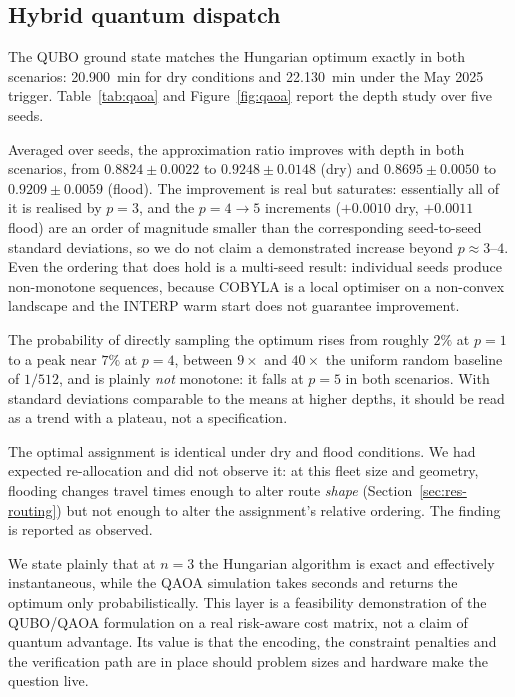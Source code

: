 \documentclass[11pt,a4paper]{article}
\begin{document}
\subsection{Hybrid quantum dispatch}
\label{sec:res-qaoa}

The QUBO ground state matches the Hungarian optimum exactly in both scenarios:
\SI{20.900}{\minute} for dry conditions and \SI{22.130}{\minute} under the
May 2025 trigger. Table~\ref{tab:qaoa} and Figure~\ref{fig:qaoa} report the depth
study over five seeds.

Averaged over seeds, the approximation ratio improves with depth in both
scenarios, from $0.8824\pm0.0022$ to $0.9248\pm0.0148$ (dry) and
$0.8695\pm0.0050$ to $0.9209\pm0.0059$ (flood). The improvement is real but
saturates: essentially all of it is realised by $p=3$, and the $p=4\to5$
increments ($+0.0010$ dry, $+0.0011$ flood) are an order of magnitude smaller
than the corresponding seed-to-seed standard deviations, so we do not claim a
demonstrated increase beyond $p\approx3$--$4$. Even the ordering that does hold
is a multi-seed result: individual seeds produce non-monotone sequences, because
COBYLA is a local optimiser on a non-convex landscape and the INTERP warm start
does not guarantee improvement.

The probability of directly sampling the optimum rises from roughly $2\%$ at
$p=1$ to a peak near $7\%$ at $p=4$, between $9\times$ and $40\times$ the uniform
random baseline of $1/512$, and is plainly \emph{not} monotone: it falls at $p=5$
in both scenarios. With standard deviations comparable to the means at higher
depths, it should be read as a trend with a plateau, not a specification.

The optimal assignment is identical under dry and flood conditions. We had
expected re-allocation and did not observe it: at this fleet size and geometry,
flooding changes travel times enough to alter route \emph{shape}
(Section~\ref{sec:res-routing}) but not enough to alter the assignment's relative
ordering. The finding is reported as observed.

We state plainly that at $n=3$ the Hungarian algorithm is exact and effectively
instantaneous, while the QAOA simulation takes seconds and returns the optimum
only probabilistically. This layer is a feasibility demonstration of the
QUBO/QAOA formulation on a real risk-aware cost matrix, not a claim of quantum
advantage. Its value is that the encoding, the constraint penalties and the
verification path are in place should problem sizes and hardware make the
question live.
\end{document}
